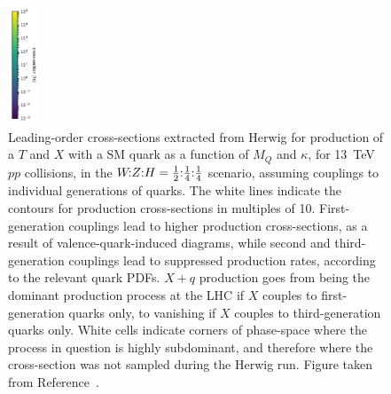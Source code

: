 \begin{figure}[tbp]
    \includegraphics[height=3.5cm]{Figures/VLQ/xsScans/3rdGen/cbar.pdf} %
    \caption{Leading-order cross-sections extracted from Herwig for production of a $T$ and $X$
      with a SM quark as a function of $M_Q$ and $\kappa$, for \SI{13}{\TeV} $pp$
      collisions, in the $\text{$W\!$:$Z$:$H$} = \text{$\tfrac{1}{2}$:$\tfrac{1}{4}$:$\tfrac{1}{4}$}$ scenario, assuming couplings to individual
      generations of quarks.  The white lines indicate the contours for production
      cross-sections in multiples of 10. First-generation couplings lead to higher
      production cross-sections, as a result of valence-quark-induced diagrams,
      while second and third-generation couplings lead to suppressed production
      rates, according to the relevant quark PDFs. $X+q$ production goes from being
      the dominant production process at the LHC if $X$ couples to first-generation
      quarks only, to vanishing if $X$ couples to third-generation quarks only.
      White cells indicate corners of phase-space where the process in question is highly subdominant, and therefore where the cross-section was not sampled during the Herwig run. Figure taken from Reference~\cite{VLQ_contur}.}
    \label{fig:Qqproduction}
\end{figure}

